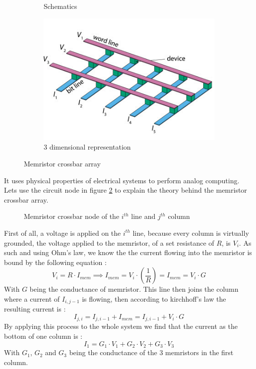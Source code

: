 \begin{figure}[H]
\centering
\begin{subfigure}{0.5\textwidth}
\centering
    
    \caption{Schematics}
\end{subfigure}%
\hfill
\begin{subfigure}{0.5\textwidth}
\centering
    \includegraphics[width=.9\linewidth]{Figures/crossbar3D.jpg}
    \caption{3 dimensional representation}
\end{subfigure}
\caption{Memristor crossbar array}
\label{fig:crossbar}
\end{figure}

It uses physical properties of electrical systems to perform analog computing. Lets use the circuit node in figure \ref{fig:crossNode} to explain the theory behind the memristor crossbar array.
\begin{figure}[H]
    \centering
    
    \caption{Memristor crossbar node of the $i^{th}$ line and $j^{th}$ column}
    \label{fig:crossNode}
\end{figure}

First of all, a voltage is applied on the $i^{th}$ line, because every column is virtually grounded, the voltage applied to the memristor, of a set resistance of $R$, is $V_i$. As such and using Ohm's law, we know the the current flowing into the memristor is bound by the following equation :
\begin{equation}
    V_i = R\cdot I_{mem} \implies I_{mem} = V_i\cdot (\frac{1}{R})=I_{mem} = V_i\cdot G
\end{equation}
With $G$ being the conductance of memristor.
This line then joins the column where a current of $I_{i,j-1}$ is flowing, then according to kirchhoff's law the resulting current is :
\begin{equation}
    I_{j,i} = I_{j,i-1}+I_{mem} = I_{j,i-1} + V_i\cdot G
\end{equation}
By applying this process to the whole system we find that the current as the bottom of one column is :
\begin{equation}
    I_1=G_1\cdot V_1 + G_2\cdot V_2 + G_3\cdot V_3
\end{equation}
With $G_1$, $G_2$ and $G_3$ being the conductance of the 3 memristors in the first column.


